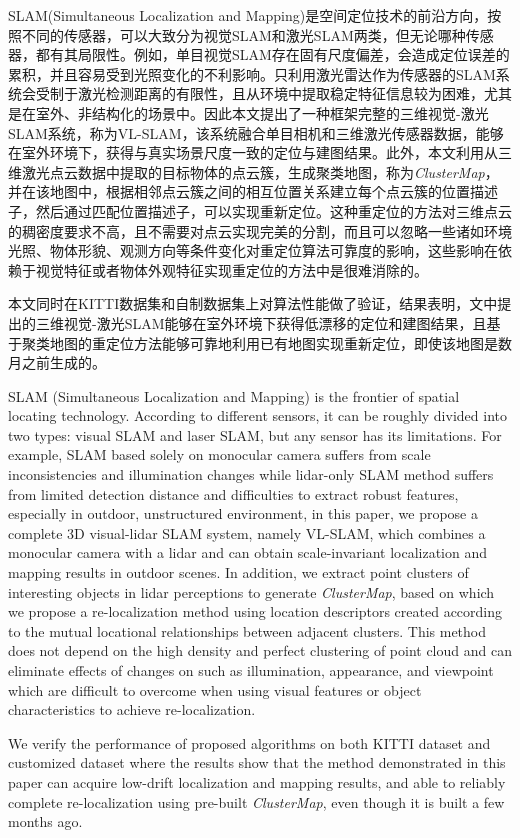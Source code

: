 \begin{cabstract}
  SLAM(Simultaneous Localization and Mapping)是空间定位技术的前沿方向，按照不同的传感器，可以大致分为视觉SLAM和激光SLAM两类，但无论哪种传感器，都有其局限性。例如，单目视觉SLAM存在固有尺度偏差，会造成定位误差的累积，并且容易受到光照变化的不利影响。只利用激光雷达作为传感器的SLAM系统会受制于激光检测距离的有限性，且从环境中提取稳定特征信息较为困难，尤其是在室外、非结构化的场景中。因此本文提出了一种框架完整的三维视觉-激光SLAM系统，称为VL-SLAM，该系统融合单目相机和三维激光传感器数据，能够在室外环境下，获得与真实场景尺度一致的定位与建图结果。此外，本文利用从三维激光点云数据中提取的目标物体的点云簇，生成聚类地图，称为\textit{ClusterMap}，并在该地图中，根据相邻点云簇之间的相互位置关系建立每个点云簇的位置描述子，然后通过匹配位置描述子，可以实现重新定位。这种重定位的方法对三维点云的稠密度要求不高，且不需要对点云实现完美的分割，而且可以忽略一些诸如环境光照、物体形貌、观测方向等条件变化对重定位算法可靠度的影响，这些影响在依赖于视觉特征或者物体外观特征实现重定位的方法中是很难消除的。

本文同时在KITTI数据集和自制数据集上对算法性能做了验证，结果表明，文中提出的三维视觉-激光SLAM能够在室外环境下获得低漂移的定位和建图结果，且基于聚类地图的重定位方法能够可靠地利用已有地图实现重新定位，即使该地图是数月之前生成的。
\end{cabstract}

\begin{eabstract}
SLAM (Simultaneous Localization and Mapping) is the frontier of spatial locating technology. According to different sensors, it can be roughly divided into two types: visual SLAM and laser SLAM, but any sensor has its limitations. For example, SLAM based solely on monocular camera suffers from scale inconsistencies and illumination changes while lidar-only SLAM method suffers from limited detection distance and difficulties to extract robust features, especially in outdoor, unstructured environment, in this paper, we propose a complete 3D visual-lidar SLAM system, namely VL-SLAM, which combines a monocular camera with a lidar and can obtain scale-invariant localization and mapping results in outdoor scenes. In addition, we extract point clusters of interesting objects in lidar perceptions to generate \textit{ClusterMap}, based on which we propose a re-localization method using location descriptors created according to the mutual locational relationships between adjacent clusters. This method does not depend on the high density and perfect clustering of point cloud and can eliminate effects of changes on such as illumination, appearance, and viewpoint which are difficult to overcome when using visual features or object characteristics to achieve re-localization.

We verify the performance of proposed algorithms on both KITTI dataset and customized dataset where the results show that the method demonstrated in this paper can acquire low-drift localization and mapping results, and able to reliably complete re-localization using pre-built \textit{ClusterMap}, even though it is built a few months ago.
\end{eabstract}

